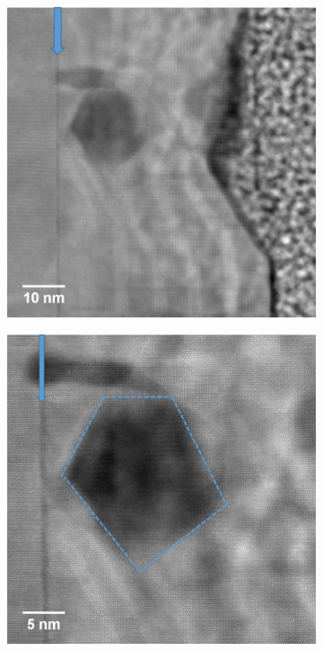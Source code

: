 \begin{figure}[!h]
	\begin{subfigure}[b]{0.45\textwidth}
		\centering
		\includegraphics[width=1\linewidth]{Figs/Ch6/Astem4}
		\caption{}
		
	\end{subfigure}%
	\hspace*{1.2cm}
	\begin{subfigure}[b]{0.45\textwidth}
		\centering
		\includegraphics[width=1\linewidth]{Figs/Ch6/AvoidDF1}
		\caption{}
	\end{subfigure}%
	

\end{figure}
